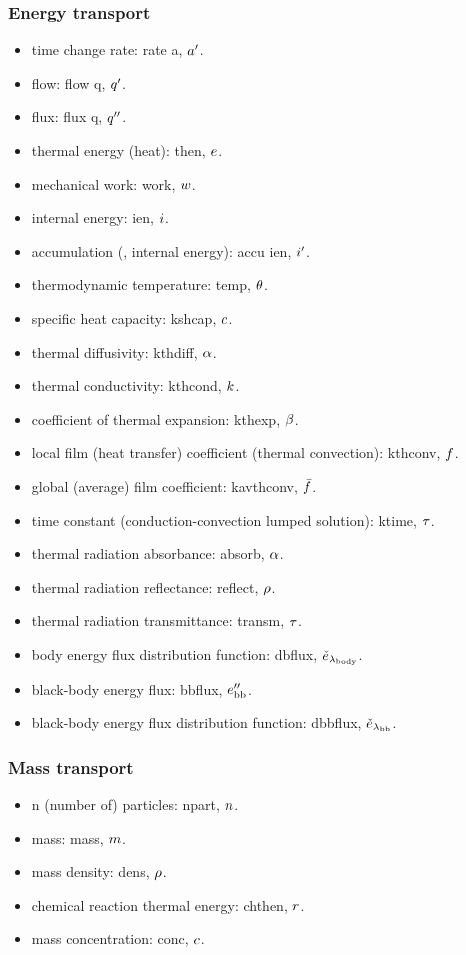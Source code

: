 \subsubsection{Energy transport}
\begin{itemize}
\item time change rate: rate a, ${a}^{\prime}$.
\item flow: flow q, ${q}^{\prime}$.
\item flux: flux q, ${q}^{\prime\prime}$.
\item thermal energy (heat): then, $e$.
\item mechanical work: work, $w$.
\item internal energy: ien, $i$.
\item accumulation (\eg, internal energy): accu ien, ${i}^{\prime}$.
\item thermodynamic temperature: temp, $\theta$.
\item specific heat capacity: kshcap, $c$.
\item thermal diffusivity: kthdiff, $\alpha$.
\item thermal conductivity: kthcond, $k$.
\item coefficient of thermal expansion: kthexp, $\beta$.
\item local film (heat transfer) coefficient (thermal convection): kthconv, $f$.
\item global (average) film coefficient: kavthconv, $\bar{f}$.
\item time constant (conduction-convection lumped solution): ktime, $\tau$.
\item thermal radiation absorbance: absorb, $\alpha$.
\item thermal radiation reflectance: reflect, $\rho$.
\item thermal radiation transmittance: transm, $\tau$.
\item body energy flux distribution function: dbflux, $\check{e}_{\lambda_\text{body}}$.
\item black-body energy flux: bbflux, ${e}^{\prime\prime}_\text{bb}$.
\item black-body energy flux distribution function: dbbflux, $\check{e}_{\lambda_\text{bb}}$.
\end{itemize}


\subsubsection{Mass transport}
\begin{itemize}
\item n (number of) particles: npart, $n$.
\item mass: mass, $m$.
\item mass density: dens, $\rho$.
\item chemical reaction thermal energy: chthen, $r$.
\item mass concentration: conc, $c$.
\end{itemize}

